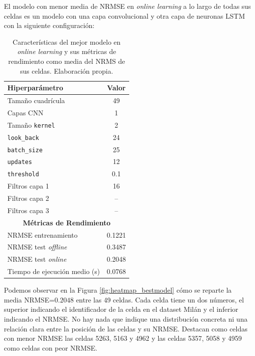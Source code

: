 El modelo con menor media de NRMSE en \textit{online learning} a lo largo de todas sus celdas es un modelo con una capa convolucional y otra capa de neuronas LSTM con la siguiente configuración:

\begin{table}[htbp]
	\centering

	\label{tab:best_model_hyperparams}
	\begin{tabular}{lc}
		\toprule
		\textbf{Hiperparámetro} & \textbf{Valor} \\
		\midrule
		Tamaño cuadrícula     & 49 \\
		Capas CNN    & 1 \\
		Tamaño \texttt{kernel}      & 2 \\
		\texttt{look\_back}    & 24 \\
		\texttt{batch\_size}   & 25 \\
		\texttt{updates}     & 12 \\
		\texttt{threshold}   & 0.1 \\
		Filtros capa 1 & 16 \\
		Filtros capa 2 & -- \\
		Filtros capa 3 & -- \\
		\midrule
		\multicolumn{2}{c}{\textbf{Métricas de Rendimiento}} \\
		\midrule
		NRMSE entrenamiento   & 0.1221 \\
		NRMSE test \textit{offline}    & 0.3487 \\
		NRMSE test \textit{online} & 0.2048 \\
		Tiempo de ejecución medio (s)  & 0.0768 \\
		\bottomrule
	\end{tabular}
	\caption{Características del mejor modelo en \textit{online learning} y sus métricas de rendimiento como media del NRMS de sus celdas. Elaboración propia.}
\end{table}

Podemos observar en la Figura \ref{fig:heatmap_bestmodel} cómo se reparte la media NRMSE=$0.2048$ entre las 49 celdas. Cada celda tiene un dos números, el superior indicando el identificador de la celda en el dataset Milán y el inferior indicando el NRMSE. No hay nada que indique una distribución concreta ni una relación clara entre la posición de las celdas y su NRMSE. Destacan como celdas con menor NRMSE las celdas 5263, 5163 y 4962 y las celdas 5357, 5058 y 4959 como celdas con peor NRMSE.

